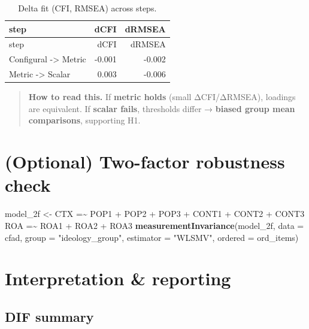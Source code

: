 \documentclass[
  10pt,
]{article}
\newenvironment{Shaded}{\begin{snugshade}}{\end{snugshade}}
\newcommand{\AttributeTok}[1]{\textcolor[rgb]{0.13,0.29,0.53}{#1}}
\newcommand{\FunctionTok}[1]{\textcolor[rgb]{0.13,0.29,0.53}{\textbf{#1}}}
\newcommand{\NormalTok}[1]{#1}
\newcommand{\OtherTok}[1]{\textcolor[rgb]{0.56,0.35,0.01}{#1}}
\newcommand{\StringTok}[1]{\textcolor[rgb]{0.31,0.60,0.02}{#1}}
\begin{document}
\begin{longtable}[]{@{}lrr@{}}
\caption{Delta fit (CFI, RMSEA) across steps.}\tabularnewline
\toprule\noalign{}
step & dCFI & dRMSEA \\
\midrule\noalign{}
\endfirsthead
\toprule\noalign{}
step & dCFI & dRMSEA \\
\midrule\noalign{}
\endhead
\bottomrule\noalign{}
\endlastfoot
Configural -\textgreater{} Metric & -0.001 & -0.002 \\
Metric -\textgreater{} Scalar & 0.003 & -0.006 \\
\end{longtable}

\begin{quote}
\textbf{How to read this.} If \textbf{metric holds} (small ΔCFI/ΔRMSEA),
loadings are equivalent. If \textbf{scalar fails}, thresholds differ →
\textbf{biased group mean comparisons}, supporting H1.
\end{quote}

\hypertarget{optional-two-factor-robustness-check}{%
\section{(Optional) Two-factor robustness
check}\label{optional-two-factor-robustness-check}}

\begin{Shaded}
\begin{Highlighting}[]
\NormalTok{model\_2f }\OtherTok{\textless{}{-}} \StringTok{\textquotesingle{}}
\StringTok{  CTX =\textasciitilde{} POP1 + POP2 + POP3 + CONT1 + CONT2 + CONT3}
\StringTok{  ROA =\textasciitilde{} ROA1 + ROA2 + ROA3}
\StringTok{\textquotesingle{}}
\FunctionTok{measurementInvariance}\NormalTok{(model\_2f, }\AttributeTok{data =}\NormalTok{ cfad, }\AttributeTok{group =} \StringTok{"ideology\_group"}\NormalTok{,}
                      \AttributeTok{estimator =} \StringTok{"WLSMV"}\NormalTok{,}
                      \AttributeTok{ordered =}\NormalTok{ ord\_items)}
\end{Highlighting}
\end{Shaded}

\hypertarget{interpretation-reporting}{%
\section{Interpretation \& reporting}\label{interpretation-reporting}}

\hypertarget{dif-summary}{%
\subsection{DIF summary}\label{dif-summary}}
\end{document}
